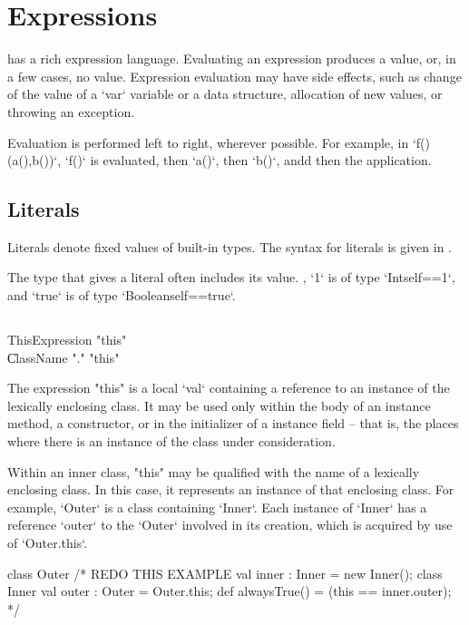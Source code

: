 \chapter{Expressions}\label{XtenExpressions}

\Xten{} has a rich expression language.
Evaluating an expression produces a value, or, in a few cases, no value. 
Expression evaluation may have side effects, such as change of the value of a 
\xcd`var` variable or a data structure, allocation of new values, or throwing
an exception. 

Evaluation is performed left to right, wherever possible.  For example, in 
\xcd`f()(a(),b())`, \xcd`f()` is evaluated, then \xcd`a()`, then \xcd`b()`,
andd then the application.  

\section{Literals}

Literals denote fixed values of built-in types. 
The syntax for literals is given in . 

The type that \Xten{} gives a literal often includes its value. \Eg, \xcd`1`
is of type \xcd`Int{self==1}`, and \xcd`true` is of type
\xcd`Boolean{self==true}`.

\section{}

\begin{grammar}
ThisExpression \: \xcd"this" \\
\| ClassName \xcd"." \xcd"this" \\
\end{grammar}

The expression \xcd"this" is a  local \xcd`val` containing a reference
to an instance of the lexically enclosing class.
It may be used only within the body of an instance method, a
constructor, or in the initializer of a instance field -- that is, the places
where there is an instance of the class under consideration.

Within an inner class, \xcd"this" may be qualified with the
name of a lexically enclosing class.  In this case, it
represents an instance of that enclosing class.  
For example, \xcd`Outer` is a class containing \xcd`Inner`.  Each instance of
\xcd`Inner` has a reference \xcd`outer` to the \xcd`Outer` involved in its
creation, which is acquired by use of \xcd`Outer.this`.
\begin{xten}
class Outer {
/* REDO THIS EXAMPLE 
  val inner : Inner = new Inner();
  class Inner {
    val outer : Outer = Outer.this;
  }
  def alwaysTrue() = (this == inner.outer);
*/}

\end{xten}
%


